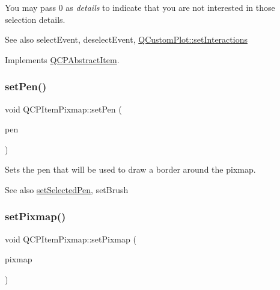 You may pass 0 as {\itshape details} to indicate that you are not interested in those selection details.

\begin{DoxySeeAlso}{See also}
select\+Event, deselect\+Event, \mbox{\hyperlink{class_q_custom_plot_a5ee1e2f6ae27419deca53e75907c27e5}{Q\+Custom\+Plot\+::set\+Interactions}} 
\end{DoxySeeAlso}


Implements \mbox{\hyperlink{class_q_c_p_abstract_item_a96d522d10ffc0413b9a366c6f7f0476b}{Q\+C\+P\+Abstract\+Item}}.

\mbox{\label{class_q_c_p_item_pixmap_acdade1305edb4b5cae14f97fd132065f}} 
\subsubsection{\texorpdfstring{set\+Pen()}{setPen()}}
{\footnotesize\ttfamily void Q\+C\+P\+Item\+Pixmap\+::set\+Pen (\begin{DoxyParamCaption}\item[{const Q\+Pen \&}]{pen }\end{DoxyParamCaption})}

Sets the pen that will be used to draw a border around the pixmap.

\begin{DoxySeeAlso}{See also}
\mbox{\hyperlink{class_q_c_p_item_pixmap_afc5e479e88e53740176ce77cb70dd67a}{set\+Selected\+Pen}}, set\+Brush 
\end{DoxySeeAlso}
\mbox{\label{class_q_c_p_item_pixmap_a726b69ea4025edf48f9b29b6450548a7}} 
\subsubsection{\texorpdfstring{set\+Pixmap()}{setPixmap()}}
{\footnotesize\ttfamily void Q\+C\+P\+Item\+Pixmap\+::set\+Pixmap (\begin{DoxyParamCaption}\item[{const Q\+Pixmap \&}]{pixmap }\end{DoxyParamCaption})}

